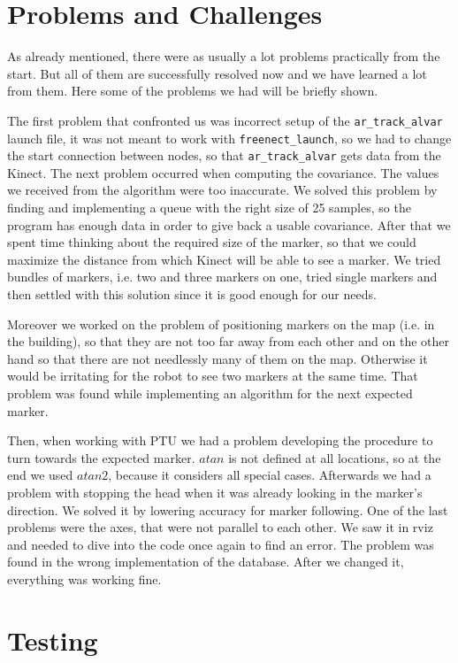\section{Problems and Challenges}

As already mentioned, there were as usually a lot problems practically from the start. But all of them are successfully resolved now and we have learned a lot from them. Here some of the problems we had will be briefly shown.

The first problem that confronted us was incorrect setup of the \texttt{ar\_track\_alvar} launch file, it was not meant to work with \texttt{freenect\_launch}, so we had to change the start connection between nodes, so that \texttt{ar\_track\_alvar} gets data from the Kinect. The next problem occurred when computing the covariance. The values we received from the algorithm were too inaccurate. We solved this problem by finding and implementing a queue with the right size of 25 samples, so the program has enough data in order to give back a usable covariance. After that we spent time thinking about the required size of the marker, so that we could maximize the distance from which Kinect will be able to see a marker. We tried bundles of markers, i.e. two and three markers on one, tried single markers and then settled with this solution since it is good enough for our needs.

Moreover we worked on the problem of positioning markers on the map (i.e. in the building), so that they are not too far away from each other and on the other hand so that there are not needlessly many of them on the map. Otherwise it would be irritating for the robot to see two markers at the same time. That problem was found while implementing an algorithm for the next expected marker.

Then, when working with PTU we had a problem developing the procedure to turn towards the expected marker. $atan$ is not defined at all locations, so at the end we used $atan2$, because it considers all special cases. Afterwards we had a problem with stopping the head when it was already looking in the marker's direction. We solved it by lowering accuracy for marker following. One of the last problems were the axes, that were not parallel to each other. We saw it in rviz and needed to dive into the code once again to find an error. The problem was found in the wrong implementation of the database. After we changed it, everything was working fine. 

\section{Testing}

